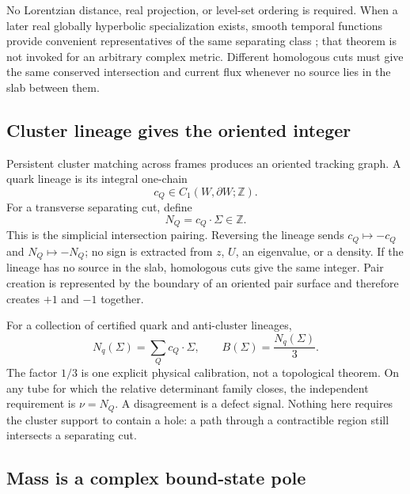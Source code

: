 \documentclass[11pt,letterpaper]{article}
\begin{document}
No Lorentzian distance, real projection, or level-set ordering is required.
When a later real globally hyperbolic specialization exists, smooth temporal
functions provide convenient representatives of the same separating class
\cite{bernalsanchez2005}; that theorem is not invoked for an arbitrary complex
metric. Different homologous cuts must give the same conserved intersection
and current flux whenever no source lies in the slab between them.

\subsection{Cluster lineage gives the oriented integer}

Persistent cluster matching across frames produces an oriented tracking graph.
A quark lineage is its integral one-chain
\begin{equation*}
  c_Q\in C_1(W,\partial W;\mathbb Z).
\end{equation*}
For a transverse separating cut, define
\begin{equation*}
  N_Q=c_Q\cdot\Sigma\in\mathbb Z .
\end{equation*}
This is the simplicial intersection pairing. Reversing the lineage sends
$c_Q\mapsto-c_Q$ and $N_Q\mapsto-N_Q$; no sign is extracted from $z$, $U$, an
eigenvalue, or a density. If the lineage has no source in the slab, homologous
cuts give the same integer. Pair creation is represented by the boundary of an
oriented pair surface and therefore creates $+1$ and $-1$ together.

For a collection of certified quark and anti-cluster lineages,
\begin{equation*}
  N_q(\Sigma)=\sum_Q c_Q\cdot\Sigma,\qquad
  B(\Sigma)=\frac{N_q(\Sigma)}{3}.
\end{equation*}
The factor $1/3$ is one explicit physical calibration, not a topological
theorem. On any tube for which the relative determinant family closes, the
independent requirement is $\nu=N_Q$. A disagreement is a defect signal.
Nothing here requires the cluster support to contain a hole: a path through a
contractible region still intersects a separating cut.

\subsection{Mass is a complex bound-state pole}
\end{document}
